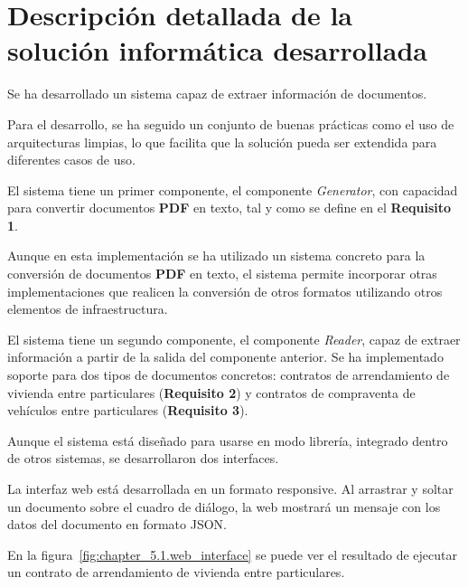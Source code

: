 \section{Descripción detallada de la solución informática desarrollada}

Se ha desarrollado un sistema capaz de extraer información de documentos.

Para el desarrollo, se ha seguido un conjunto de buenas prácticas como el uso de arquitecturas limpias, lo que facilita
que la solución pueda ser extendida para diferentes casos de uso.

El sistema tiene un primer componente, el componente \textit{Generator}, con capacidad para convertir documentos
\textbf{PDF} en texto, tal y como se define en el \textbf{Requisito 1}.

Aunque en esta implementación se ha utilizado un sistema concreto para la conversión de documentos \textbf{PDF}
en texto, el sistema permite incorporar otras implementaciones que realicen la conversión de otros formatos utilizando
otros elementos de infraestructura.

El sistema tiene un segundo componente, el componente \textit{Reader}, capaz de extraer información a partir de la
salida del componente anterior.
Se ha implementado soporte para dos tipos de documentos concretos: contratos de arrendamiento de vivienda entre
particulares (\textbf{Requisito 2}) y contratos de compraventa de vehículos entre particulares (\textbf{Requisito 3}).

Aunque el sistema está diseñado para usarse en modo librería, integrado dentro de otros sistemas, se desarrollaron dos
interfaces.

La interfaz web está desarrollada en un formato responsive.
Al arrastrar y soltar un documento sobre el cuadro de diálogo, la web mostrará un mensaje con los datos del documento en
formato JSON.

En la figura~\ref{fig:chapter_5.1.web_interface} se puede ver el resultado de ejecutar un contrato de arrendamiento
de vivienda entre particulares.

